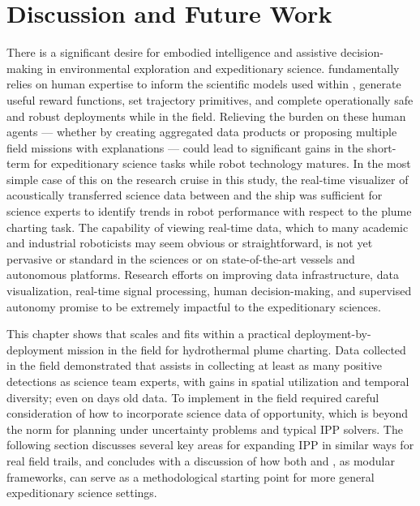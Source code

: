 \section{Discussion and Future Work}
\label{sec:future}
There is a significant desire for embodied intelligence and assistive decision-making in environmental exploration and expeditionary science. \PHORTEX fundamentally relies on human expertise to inform the scientific models used within \PHUMES, generate useful reward functions, set trajectory primitives, and complete operationally safe and robust deployments while in the field. Relieving the burden on these human agents --- whether by creating aggregated data products or proposing multiple field missions with explanations --- could lead to significant gains in the short-term for expeditionary science tasks while robot technology matures. In the most simple case of this on the research cruise in this study, the real-time visualizer of acoustically transferred science data between \Sentry and the ship was sufficient for science experts to identify trends in robot performance with respect to the plume charting task. The capability of viewing real-time data, which to many academic and industrial roboticists may seem obvious or straightforward, is not yet pervasive or standard in the sciences or on state-of-the-art vessels and autonomous platforms. Research efforts on improving data infrastructure, data visualization, real-time signal processing, human decision-making, and supervised autonomy promise to be extremely impactful to the expeditionary sciences. 

This chapter shows that \PHORTEX scales and fits within a practical deployment-by-deployment mission in the field for hydrothermal plume charting. Data collected in the field demonstrated that \PHORTEX assists in collecting at least as many positive detections as science team experts, with gains in spatial utilization and temporal diversity; even on days old data. To implement \PHORTEX in the field required careful consideration of how to incorporate science data of opportunity, which is beyond the norm for planning under uncertainty problems and typical IPP solvers. The following section discusses several key areas for expanding IPP in similar ways for real field trails, and concludes with a discussion of how both \PHORTEX and \PHUMES, as modular frameworks, can serve as a methodological starting point for more general expeditionary science settings.

